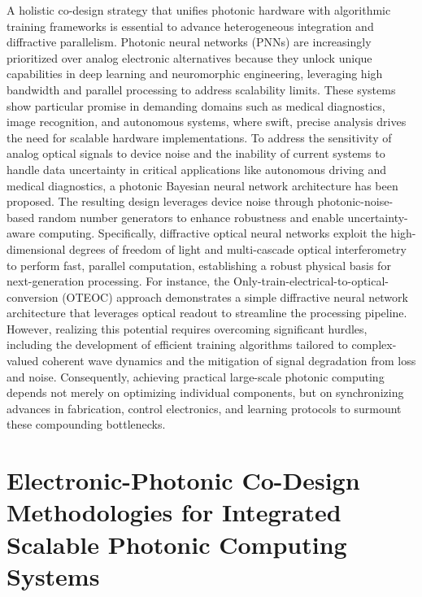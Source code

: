 A holistic co-design strategy that unifies photonic hardware with algorithmic training frameworks is essential to advance heterogeneous integration and diffractive parallelism. Photonic neural networks (PNNs) are increasingly prioritized over analog electronic alternatives because they unlock unique capabilities in deep learning and neuromorphic engineering, leveraging high bandwidth and parallel processing to address scalability limits. These systems show particular promise in demanding domains such as medical diagnostics, image recognition, and autonomous systems, where swift, precise analysis drives the need for scalable hardware implementations. To address the sensitivity of analog optical signals to device noise and the inability of current systems to handle data uncertainty in critical applications like autonomous driving and medical diagnostics, a photonic Bayesian neural network architecture has been proposed. The resulting design leverages device noise through photonic-noise-based random number generators to enhance robustness and enable uncertainty-aware computing. \citep{doi_10_1002_advs_202500525_74e7146e} Specifically, diffractive optical neural networks exploit the high-dimensional degrees of freedom of light and multi-cascade optical interferometry to perform fast, parallel computation, establishing a robust physical basis for next-generation processing. For instance, the Only-train-electrical-to-optical-conversion (OTEOC) approach demonstrates a simple diffractive neural network architecture that leverages optical readout to streamline the processing pipeline. \citep{doi_10_1364_oe_462370_1269b480} However, realizing this potential requires overcoming significant hurdles, including the development of efficient training algorithms tailored to complex-valued coherent wave dynamics and the mitigation of signal degradation from loss and noise. Consequently, achieving practical large-scale photonic computing depends not merely on optimizing individual components, but on synchronizing advances in fabrication, control electronics, and learning protocols to surmount these compounding bottlenecks. \citep{doi_10_3390_nano14080697_c372a140} \citep{s2_b765388f3cc18d6e5a0507522822def0e3503ec6_fa09b483}

\section{Electronic-Photonic Co-Design Methodologies for Integrated Scalable Photonic Computing Systems}\label{electronic-photonic-co-design-methodologies-for-integrated-scalable-photonic-computing-systems}

